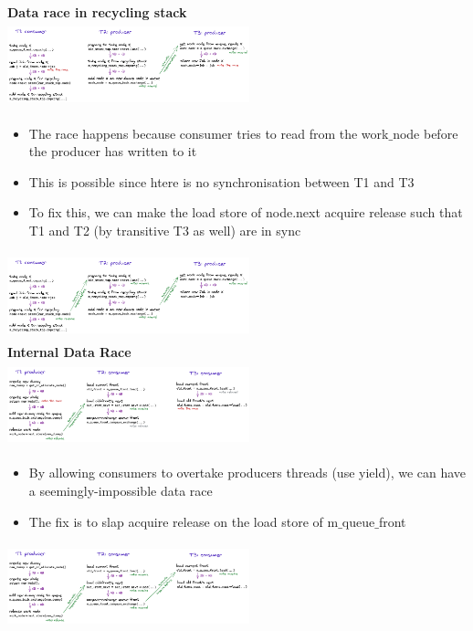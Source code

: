 \documentclass[10pt, landscape]{article}
\begin{document}
\begin{multicols}{4}
\textbf{Data race in recycling stack} \\
\includegraphics*[width=7cm,height=2.5cm]{recycling1.png}

\begin{itemize}
    \item The race happens because consumer tries to read from the work$\_$node before the producer has written to it
    \item This is possible since htere is no synchronisation between T1 and T3 
    \item To fix this, we can make the load store of node.next acquire release such that T1 and T2 (by transitive T3 as well) are in sync
\end{itemize}
\includegraphics*[width=7cm,height=2.5cm]{recycling2.png} \\

\textbf{Internal Data Race} \\
\includegraphics*[width=7cm,height=2.5cm]{recycling3.png}
\begin{itemize}
    \item By allowing consumers to overtake producers threads (use yield), we can have a seemingly-impossible data race
    \item The fix is to slap acquire release on the load store of m$\_$queue$\_$front
\end{itemize}
\includegraphics*[width=7cm,height=2.5cm]{recycling4.png}\\


\end{multicols}
\end{document}
